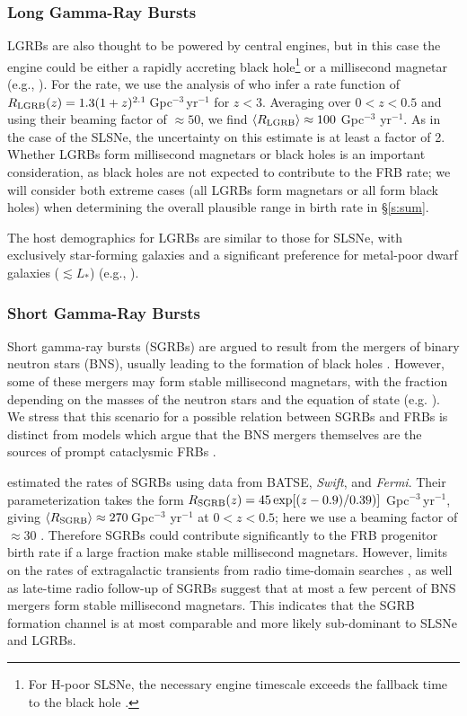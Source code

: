 \documentclass[twocolumn]{aastex6}
\begin{document}
\subsubsection{Long Gamma-Ray Bursts}

LGRBs are also thought to be powered by central engines, but in this case the engine could be either a rapidly accreting black hole\footnote{For H-poor SLSNe, the necessary engine timescale exceeds the fallback time to the black hole \citep{dex2013}.} or a millisecond magnetar (e.g., \citealt{Thompson+04,mgt+2011,maz2014}). For the rate, we use the analysis of \citet{wp.2010} who infer a rate function of $R_{\rm LGRB}(z)=1.3(1+z)^{2.1}$\,Gpc$^{-3}$\,yr$^{-1}$ for $z<3$. Averaging over $0<z<0.5$ and using their beaming factor of $\approx 50$, we find $\langle R_{\rm LGRB}\rangle\approx 100$ Gpc$^{-3}$ yr$^{-1}$.  As in the case of the SLSNe, the uncertainty on this estimate is at least a factor of 2. Whether LGRBs form millisecond magnetars or black holes is an important consideration, as black holes are not expected to contribute to the FRB rate; we will consider both extreme cases (all LGRBs form magnetars or all form black holes) when determining the overall plausible range in birth rate in \S\ref{s:sum}.

The host demographics for LGRBs are similar to those for SLSNe, with exclusively star-forming galaxies and a significant preference for metal-poor dwarf galaxies ($\lesssim L_*$) (e.g., \citealt{chr2004,fru2006,schulze2015,perley2016}).

\subsubsection{Short Gamma-Ray Bursts}

Short gamma-ray bursts (SGRBs) are argued to result from the mergers of binary neutron stars (BNS), usually leading to the formation of black holes \citep{ber2014}.  However, some of these mergers may form stable millisecond magnetars, with the fraction depending on the masses of the neutron stars and the equation of state (e.g. \citealt{Metzger+08,Giacomazzo&Perna13}).  We stress that this scenario for a possible relation between SGRBs and FRBs is distinct from models which argue that the BNS mergers themselves are the sources of prompt cataclysmic FRBs \citep{tot2013}.

\citet{wp.2015} estimated the rates of SGRBs using data from BATSE, \emph{Swift}, and \emph{Fermi}. Their parameterization takes the form $R_{\rm SGRB}(z)=45 \exp[(z-0.9)/0.39)]$ Gpc$^{-3}$\,yr$^{-1}$, giving $\langle R_{\rm SGRB}\rangle\approx 270$\,Gpc$^{-3}$ yr$^{-1}$ at $0<z<0.5$; here we use a beaming factor of $\approx 30$ \citep{fong2015}. Therefore SGRBs could contribute significantly to the FRB progenitor birth rate if a large fraction make stable millisecond magnetars.  However, limits on the rates of extragalactic transients from radio time-domain searches \citep{met2015}, as well as late-time radio follow-up of SGRBs \citep{fong2016} suggest that at most a few percent of BNS mergers form stable millisecond magnetars.  This indicates that the SGRB formation channel is at most comparable and more likely sub-dominant to SLSNe and LGRBs.
\end{document}
